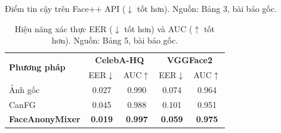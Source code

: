 \documentclass[oneside,a4paper,12pt]{extarticle}
\begin{document}
\begin{table}[H]
\centering
\scriptsize
\setlength{\tabcolsep}{2pt}
\begin{minipage}[t]{0.45\textwidth}
\centering
\caption[Điểm tin cậy tương đồng trên dịch vụ Face++ API]{Điểm tin cậy trên Face++ API ($\downarrow$ tốt hơn). Nguồn: Bảng 3, bài báo gốc.}
\label{tab:facepp}
\end{minipage}
\hfill
\begin{minipage}[t]{0.52\textwidth}
\centering
\caption[Hiệu năng xác thực EER và AUC sau bảo vệ]{Hiệu năng xác thực EER ($\downarrow$ tốt hơn) và AUC ($\uparrow$ tốt hơn). Nguồn: Bảng 5, bài báo gốc.}
\label{tab:utility}
\begin{tabular}{|l|cc|cc|}
\hline
\multirow{2}{*}{\textbf{Phương pháp}} & \multicolumn{2}{c|}{\textbf{CelebA-HQ}} & \multicolumn{2}{c|}{\textbf{VGGFace2}} \\
\cline{2-5}
 & EER$\downarrow$ & AUC$\uparrow$ & EER$\downarrow$ & AUC$\uparrow$ \\
\hline
Ảnh gốc & 0.027 & 0.990 & 0.074 & 0.964 \\
CanFG & 0.045 & 0.988 & 0.101 & 0.951 \\
\textbf{FaceAnonyMixer} & \textbf{0.019} & \textbf{0.997} & \textbf{0.059} & \textbf{0.975} \\
\hline
\end{tabular}
\end{minipage}
\end{table}
\end{document}
